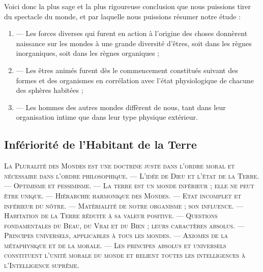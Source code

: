 \documentclass[a4paper, 11pt, oneside, landscape]{article}
\begin{document}
Voici donc la plus sage et la plus rigoureuse conclusion que nous puissions tirer du spectacle du monde, et par laquelle nous puissions résumer notre étude :
\begin{enumerate}
    \item --- Les forces diverses qui furent en action à l'origine des choses donnèrent naissance sur les mondes à une grande diversité d'êtres, soit dans les règnes inorganiques, soit dans les règnes organiques ;

    \item --- Les êtres animés furent dès le commencement constitués suivant des formes et des organismes en corrélation avec l'état physiologique de chacune des sphères habitées ;

    \item --- Les hommes des autres mondes diffèrent de nous, tant dans leur organisation intime que dans leur type physique extérieur.
\end{enumerate}
\clearpage
\subsection{Infériorité de l'Habitant de la Terre}
\begin{center}
\scshape
\small
La Pluralité des Mondes est une doctrine juste dans l'ordre moral et nécessaire dans l'ordre philosophique. --- L'idée de Dieu et l'état de la Terre. --- Optimisme et pessimisme. --- La terre est un monde inférieur ; elle ne peut être unique. --- Hiérarchie harmonique des Mondes. --- Etat incomplet et inférieur du nôtre. --- Matérialité de notre organisme ; son influence. --- Habitation de la Terre réduite à sa valeur positive. --- Questions fondamentales du Beau, du Vrai et du Bien ; leurs caractères absolus. --- Principes universels, applicables à tous les mondes. --- Axiomes de la métaphysique et de la morale. --- Les principes absolus et universels constituent l'unité morale du monde et relient toutes les intelligences à l'Intelligence suprême.
\end{center}
\end{document}
